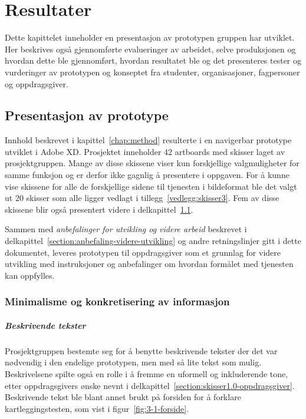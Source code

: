 \cleardoublepage
\chapter{Resultater}
\label{chap:results} 

Dette kapittelet inneholder en presentasjon av prototypen gruppen har utviklet. Her beskrives også gjennomførte evalueringer av arbeidet, selve produksjonen og hvordan dette ble gjennomført, hvordan resultatet ble og det presenteres tester og vurderinger av prototypen og konseptet fra studenter, organisasjoner, fagpersoner og oppdragsgiver.

\section{Presentasjon av prototype}
\label{section:presentasjon-produkt}
Innhold beskrevet i kapittel~\ref{chap:method} resulterte i en navigerbar prototype utviklet i Adobe XD. Prosjektet inneholder 42 artboards med skisser laget av prosjektgruppen. Mange av disse skissene viser kun forskjellige valgmuligheter for samme funksjon og er derfor ikke gagnlig å presentere i oppgaven. For å kunne vise skissene for alle de forskjellige sidene til tjenesten i bildeformat ble det valgt ut 20 skisser som alle ligger vedlagt i tillegg~\ref{vedlegg:skisser3}. Fem av disse skissene blir også presentert videre i delkapittel~\ref{section:presentasjon-produkt}.

Sammen med {\em anbefalinger for utvikling og videre arbeid} beskrevet i delkapittel~\ref{section:anbefaling-videre-utvikling} og andre retningslinjer gitt i dette dokumentet, leveres prototypen til oppdragsgiver som et grunnlag for videre utvikling med instruksjoner og anbefalinger om hvordan formålet med tjenesten kan oppfylles.

\subsection{Minimalisme og konkretisering av informasjon}

\paragraph{Beskrivende tekster}
Prosjektgruppen bestemte seg for å benytte beskrivende tekster der det var nødvendig i den endelige prototypen, men med så lite tekst som mulig. Beskrivelsene spilte også en rolle i å fremme en uformell og inkluderende tone, etter oppdragsgivers ønske nevnt i delkapittel~\ref{section:skisser1.0-oppdragsgiver}. Beskrivende tekst ble blant annet brukt på forsiden for å forklare kartleggingstesten, som vist i figur~\ref{fig:3-1-forside}.

